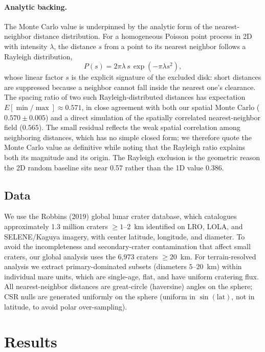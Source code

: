 \documentclass[12pt,a4paper]{article}
\begin{document}
\paragraph{Analytic backing.} The Monte Carlo value is underpinned by the analytic form of the nearest-neighbor distance distribution. For a homogeneous Poisson point process in 2D with intensity $\lambda$, the distance $s$ from a point to its nearest neighbor follows a Rayleigh distribution,
\begin{equation}
P(s) = 2\pi\lambda\, s \, \exp(-\pi\lambda s^2),
\end{equation}
whose linear factor $s$ is the explicit signature of the excluded disk: short distances are suppressed because a neighbor cannot fall inside the nearest one's clearance. The spacing ratio of two such Rayleigh-distributed distances has expectation $E[\min/\max]\approx0.571$, in close agreement with both our spatial Monte Carlo ($0.570\pm0.005$) and a direct simulation of the spatially correlated nearest-neighbor field ($0.565$). The small residual reflects the weak spatial correlation among neighboring distances, which has no simple closed form; we therefore quote the Monte Carlo value as definitive while noting that the Rayleigh ratio explains both its magnitude and its origin. The Rayleigh exclusion is the geometric reason the 2D random baseline sits near 0.57 rather than the 1D value 0.386.

\subsection{Data}

We use the Robbins (2019) global lunar crater database, which catalogues approximately 1.3 million craters $\geq1$--2~km identified on LRO, LOLA, and SELENE/Kaguya imagery, with center latitude, longitude, and diameter. To avoid the incompleteness and secondary-crater contamination that affect small craters, our global analysis uses the 6{,}973 craters $\geq20$~km. For terrain-resolved analysis we extract primary-dominated subsets (diameters $5$--$20$~km) within individual mare units, which are single-age, flat, and have uniform cratering flux. All nearest-neighbor distances are great-circle (haversine) angles on the sphere; CSR nulls are generated uniformly on the sphere (uniform in $\sin(\mathrm{lat})$, not in latitude, to avoid polar over-sampling).

\section{Results}
\end{document}
